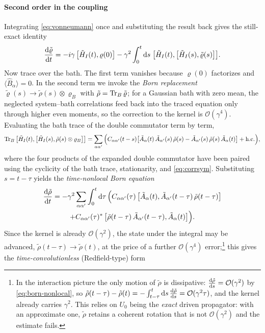 \documentclass[a4paper,11pt]{article}
\begin{document}
\paragraph{Second order in the coupling}
Integrating \cref{eq:vonneumann} once and substituting the result back gives the still-exact identity
\begin{equation}\label{eq:iterated}
  \dv{\tilde\varrho}{t}
  = -i\gamma\,\comm{\tilde H_I(t)}{\varrho(0)}
  - \gamma^2\int_0^t \dd s\;\comm{\tilde H_I(t)}{\comm{\tilde H_I(s)}{\tilde\varrho(s)}}.
\end{equation}
Now trace over the bath. The first term vanishes because $\varrho(0)$ factorizes and $\langle\hat B_\alpha\rangle = 0$. In the second term we invoke the \emph{Born replacement} $\tilde\varrho(s) \to \tilde\rho(s)\otimes\varrho_B$ with $\tilde\rho = \Tr_B\tilde\varrho$; for a Gaussian bath with zero mean, the neglected system--bath correlations feed back into the traced equation only through higher even moments, so the correction to the kernel is $\mathcal O(\gamma^4)$. Evaluating the bath trace of the double commutator term by term,
\begin{equation}\label{eq:fourterms}
  \Tr_B\comm{\tilde H_I(t)}{\comm{\tilde H_I(s)}{\tilde\rho(s)\otimes\varrho_B}}
  = \sum_{\alpha\alpha'}\Big(
    C_{\alpha\alpha'}(t-s)\big[\tilde A_\alpha(t)\,\tilde A_{\alpha'}(s)\,\tilde\rho(s)
  - \tilde A_{\alpha'}(s)\,\tilde\rho(s)\,\tilde A_\alpha(t)\big] + \text{h.c.}\Big),
\end{equation}
where the four products of the expanded double commutator have been paired using the cyclicity of the bath trace, stationarity, and \cref{eq:corrsym}. Substituting $s = t - \tau$ yields the \emph{time-nonlocal Born equation}
\begin{multline}\label{eq:born-nonlocal}
  \dv{\tilde\rho}{t}
  = -\gamma^2\sum_{\alpha\alpha'}\int_0^t \dd\tau\,\Big(
    C_{\alpha\alpha'}(\tau)\,\comm{\tilde A_\alpha(t)}{\tilde A_{\alpha'}(t-\tau)\,\tilde\rho(t-\tau)}\\
    + C_{\alpha\alpha'}(\tau)^*\,\comm{\tilde\rho(t-\tau)\,\tilde A_{\alpha'}(t-\tau)}{\tilde A_\alpha(t)}
  \Big).
\end{multline}
Since the kernel is already $\mathcal O(\gamma^2)$, the state under the integral may be advanced, $\tilde\rho(t-\tau)\to\tilde\rho(t)$, at the price of a further $\mathcal O(\gamma^4)$ error;\footnote{In the interaction picture the only motion of $\tilde\rho$ is dissipative: $\dv{\tilde\rho}{s} = \mathcal O(\gamma^2)$ by \eqref{eq:born-nonlocal}, so $\tilde\rho(t-\tau) - \tilde\rho(t) = -\int_{t-\tau}^{t}\dd s\,\dv{\tilde\rho}{s} = \mathcal O(\gamma^2\tau)$, and the kernel already carries $\gamma^2$. This relies on $U_0$ being the \emph{exact} driven propagator: with an approximate one, $\tilde\rho$ retains a coherent rotation that is not $\mathcal O(\gamma^2)$ and the estimate fails.} this gives the \emph{time-convolutionless} (Redfield-type) form
\end{document}
